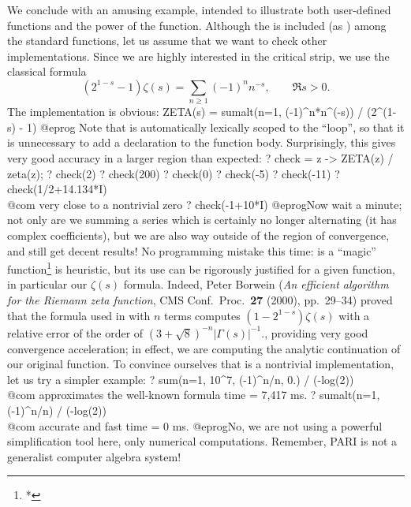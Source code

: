  We conclude with an amusing example, intended to
illustrate both user-defined functions and the power of the 
function. Although the  is included (as
) among the standard functions, let us assume that we want to check
other implementations. Since we are highly interested in the critical strip,
we use the classical formula
$$ (2^{1-s} - 1)\zeta(s) = \sum_{n\geq 1} (-1)^n n^{-s},
  \qquad\Re s > 0.$$
The implementation is obvious:
\bprog
ZETA(s) = sumalt(n=1, (-1)^n*n^(-s)) / (2^(1-s) - 1)
@eprog
\noindent
Note that  is automatically lexically scoped to the 
``loop'', so that it is unnecessary to add a  declaration to the
function body. Surprisingly, this gives very good accuracy in a larger region
than expected:
\bprog
? check = z -> ZETA(z) / zeta(z);
? check(2)
? check(200)
? check(0)
? check(-5)
? check(-11)
? check(1/2+14.134*I)  \\@com very close to a nontrivial zero
? check(-1+10*I)
@eprog\noindent Now wait a minute; not only are we summing a series which is
certainly no longer alternating (it has complex coefficients), but we are
also way outside of the region of convergence, and still get decent results! No
programming mistake this time:  is a
``magic'' function\footnote{*}{ is heuristic, but its use can be
rigorously justified for a given function, in particular our $\zeta(s)$
formula. Indeed, Peter Borwein (\emph{An efficient algorithm for the Riemann
zeta function}, CMS Conf.~Proc.~{\bf 27} (2000), pp.~29--34) proved that the
formula used in  with $n$ terms computes $(1-2^{1-s})\zeta(s)$
with a relative error of the order of $(3+\sqrt{8})^{-n}|\Gamma(s)|^{-1}$.},
providing very good convergence acceleration; in effect, we are computing
the analytic continuation of our original function. To convince ourselves
that  is a nontrivial implementation, let us try a simpler
example:
\bprog
? sum(n=1, 10^7, (-1)^n/n, 0.) / (-log(2)) \\@com approximates the well-known formula
time = 7,417 ms.
? sumalt(n=1, (-1)^n/n) / (-log(2))        \\@com accurate and fast
time = 0 ms.
@eprog\noindent No, we are not using a powerful simplification tool here,
only numerical computations. Remember, PARI is not a generalist computer
algebra system!


